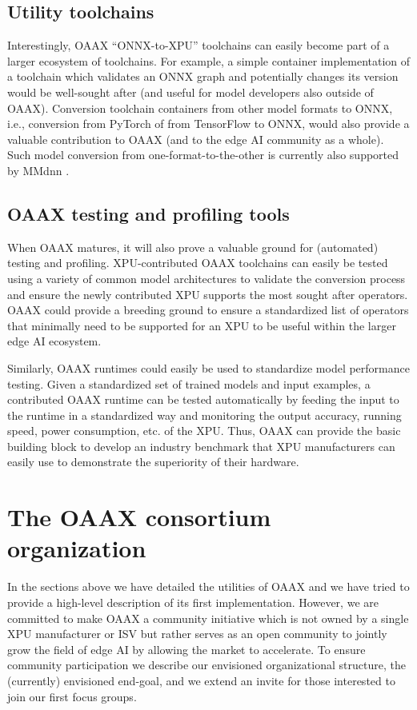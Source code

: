 \documentclass{article}
\begin{document}
\subsection{Utility toolchains}

Interestingly, OAAX ``ONNX-to-XPU'' toolchains can easily become part of a larger ecosystem of toolchains. For example, a simple container implementation of a toolchain which validates an ONNX graph and potentially changes its version would be well-sought after (and useful for model developers also outside of OAAX). Conversion toolchain containers from other model formats to ONNX, i.e., conversion from PyTorch of from TensorFlow to ONNX, would also provide a valuable contribution to OAAX (and to the edge AI community as a whole). Such model conversion from one-format-to-the-other is currently also supported by MMdnn \cite{MMdnn}.

\subsection{OAAX testing and profiling tools}

When OAAX matures, it will also prove a valuable ground for (automated) testing and profiling. XPU-contributed OAAX toolchains can easily be tested using a variety of common model architectures to validate the conversion process and ensure the newly contributed XPU supports the most sought after operators. OAAX could provide a breeding ground to ensure a standardized list of operators that minimally need to be supported for an XPU to be useful within the larger edge AI ecosystem.

Similarly, OAAX runtimes could easily be used to standardize model performance testing. Given a standardized set of trained models and input examples, a contributed OAAX runtime can be tested automatically by feeding the input to the runtime in a standardized way and monitoring the output accuracy, running speed, power consumption, etc. of the XPU. Thus, OAAX can provide the basic building block to develop an industry benchmark that XPU manufacturers can easily use to demonstrate the superiority of their hardware.

\section{The OAAX consortium organization}
\label{sec:oaax-organization}

In the sections above we have detailed the utilities of OAAX and we have tried to provide a high-level description of its first implementation. However, we are committed to make OAAX a community initiative which is not owned by a single XPU manufacturer or ISV but rather serves as an open community to jointly grow the field of edge AI by allowing the market to accelerate. To ensure community participation we describe our envisioned organizational structure, the (currently) envisioned end-goal, and we extend an invite for those interested to join our first focus groups.
\end{document}
